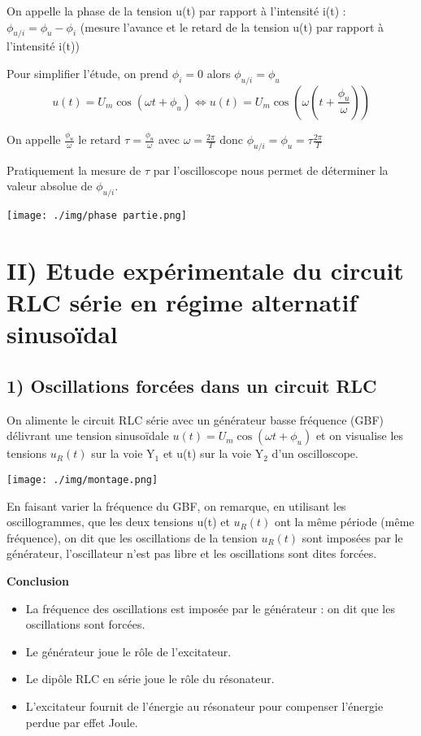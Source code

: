 \documentclass[12pt]{article}
\begin{document}
On appelle la phase de la tension u(t) par rapport à l'intensité i(t) : $\phi_{u/i} = \phi_u - \phi_i$ (mesure l'avance et le retard de la tension u(t) par rapport à l'intensité i(t))

Pour simplifier l'étude, on prend $\phi_i = 0$ alors $\phi_{u/i} = \phi_u$
\[ u(t) = U_m\cos(\omega t + \phi_u) \Leftrightarrow u(t) = U_m\cos(\omega(t + \frac{\phi_u}{\omega})) \]

On appelle $\frac{\phi_u}{\omega}$ le retard $\tau = \frac{\phi_u}{\omega}$ avec $\omega = \frac{2\pi}{T}$ donc $\phi_{u/i} = \phi_u = \tau\frac{2\pi}{T}$

Pratiquement la mesure de $\tau$ par l'oscilloscope nous permet de déterminer la valeur absolue de $\phi_{u/i}$.

  \begin{center}
    \texttt{[image: ./img/phase partie.png]}
  \end{center}


\section*{II) Etude expérimentale du circuit RLC série en régime alternatif sinusoïdal}

\subsection*{1) Oscillations forcées dans un circuit RLC}
On alimente le circuit RLC série avec un générateur basse fréquence (GBF) délivrant une tension sinusoïdale $u(t) = U_m\cos(\omega t + \phi_u)$ et on visualise les tensions $u_R(t)$ sur la voie Y$_1$ et u(t) sur la voie Y$_2$ d'un oscilloscope.

  \begin{center}
    \texttt{[image: ./img/montage.png]}
  \end{center}



En faisant varier la fréquence du GBF, on remarque, en utilisant les oscillogrammes, que les deux tensions u(t) et $u_R(t)$ ont la même période (même fréquence), on dit que les oscillations de la tension $u_R(t)$ sont imposées par le générateur, l'oscillateur n'est pas libre et les oscillations sont dites forcées.

\textbf{Conclusion}
\begin{itemize}
\item La fréquence des oscillations est imposée par le générateur : on dit que les oscillations sont forcées.
\item Le générateur joue le rôle de l'excitateur.
\item Le dipôle RLC en série joue le rôle du résonateur.
\item L'excitateur fournit de l'énergie au résonateur pour compenser l'énergie perdue par effet Joule.
\end{itemize}
\end{document}
